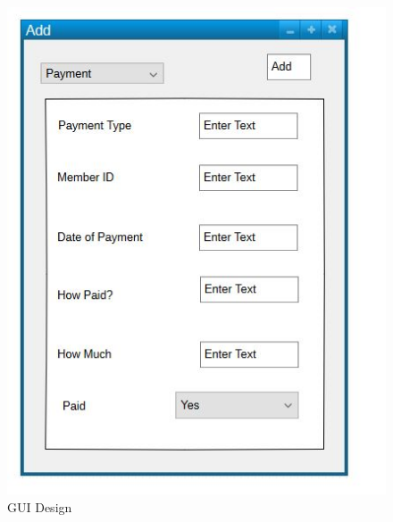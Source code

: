 \begin{figure}[H]
    \includegraphics[width=\textwidth]{Gui_4.JPG}
    \caption{GUI Design} \label{fig:GUI Designs}
\end{figure}

